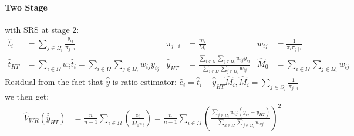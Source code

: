 \documentclass[landscape]{article}
\begin{document}
\begin{multicols*}{3}
\paragraph{Two Stage} with SRS at stage 2:
\begin{align*}
  \hat{t}_i & = \sum_{j \in \Omega_i} \frac{y_{ij}}{\pi_{j \mid i}} &  \pi_{j \mid i} & = \frac{m_i}{M_i}
  & w_{ij} & = \frac{1}{\pi_{i} \pi_{j \mid i}}
  \\ \hat{t}_{HT} & = \sum_{i \in \Omega} w_i \hat{t}_i = \sum_{i \in \Omega} \sum_{j \in \Omega_i} w_{ij}y_{ij}
  & \hat{\overline{y}}_{HT} & = \frac{\sum_{i \in \Omega}\sum_{j \in \Omega_i} w_{ij}y_{ij}}{\sum_{i \in \Omega}\sum_{j \in \Omega_i}w_{ij}}
  & \hat{M}_0 & = \sum_{i \in \Omega} \sum_{j \in \Omega_i} w_{ij}
\end{align*}
Residual from the fact that $\hat{\overline{y}}$ is ratio estimator:
$\hat{e}_i = \hat{t}_i - \hat{\overline{y}}_{HT} \hat{M}_i, \hat{M}_i
= \sum_{j \in \Omega_i} \frac{1}{\pi_{j \mid i}}$ we then get:
\begin{align*}
  \hat{V}_{WR}(\hat{\overline{y}}_{HT}) & = \frac{n}{n-1} \sum_{i \in \Omega} \left(\frac{\hat{e}_i}{\hat{M}_0 \pi_i}\right) = \frac{n}{n-1} \sum_{i \in \Omega} \left(\frac{\sum_{j \in \Omega_i} w_{ij} (y_{ij} - \overline{y}_{HT})}{\sum_{k \in \Omega} \sum_{j \in \Omega_i} w_{kj}}\right)^2
\end{align*}

\end{multicols*}
\end{document}

